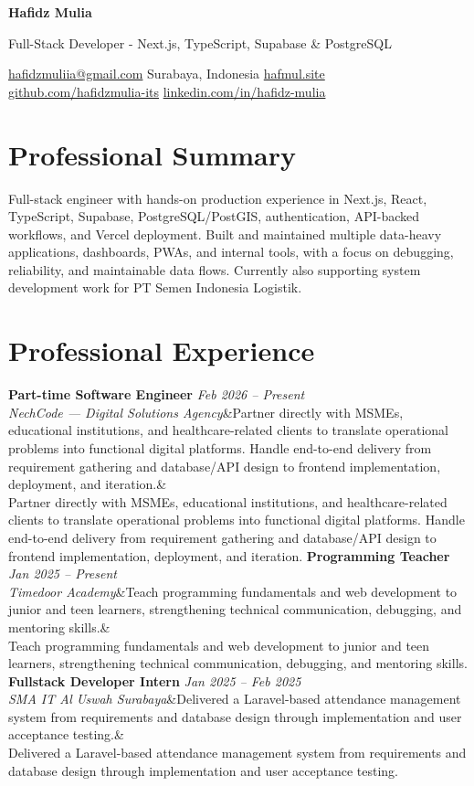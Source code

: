 \documentclass[a4paper,10.5pt]{article}
\newcommand{\cvname}[1]{{\centering\LARGE\bfseries #1\par\vspace{1pt}}}
\newcommand{\cvtitle}[1]{{\centering\normalsize\color{accent} #1\par\vspace{2pt}}}
\newcommand{\cvcontact}[1]{{\centering\small #1\par\vspace{4pt}}}
\newcommand{\cventry}[4]{\noindent\textbf{#1} \hfill \textit{#3} \\\textit{#2}\ifx&#4& \else \\ {\small #4} \fi\vspace{4pt}}
\begin{document}
\cvname{Hafidz Mulia}
\cvtitle{Full-Stack Developer - Next.js, TypeScript, Supabase \& PostgreSQL}
\cvcontact{\href{mailto:hafidzmuliia@gmail.com}{hafidzmuliia@gmail.com} \quad\textbar\quad Surabaya, Indonesia \quad\textbar\quad \href{https://hafmul.site}{hafmul.site} \\
\href{https://github.com/hafidzmulia-its}{github.com/hafidzmulia-its} \quad\textbar\quad \href{https://www.linkedin.com/in/hafidz-mulia/}{linkedin.com/in/hafidz-mulia}}

\section{Professional Summary}
Full-stack engineer with hands-on production experience in Next.js, React, TypeScript, Supabase, PostgreSQL/PostGIS, authentication, API-backed workflows, and Vercel deployment. Built and maintained multiple data-heavy applications, dashboards, PWAs, and internal tools, with a focus on debugging, reliability, and maintainable data flows. Currently also supporting system development work for PT Semen Indonesia Logistik.

\section{Professional Experience}
\cventry{Part-time Software Engineer}{NechCode --- Digital Solutions Agency}{Feb 2026 -- Present}{Partner directly with MSMEs, educational institutions, and healthcare-related clients to translate operational problems into functional digital platforms. Handle end-to-end delivery from requirement gathering and database/API design to frontend implementation, deployment, and iteration.}
\cventry{Programming Teacher}{Timedoor Academy}{Jan 2025 -- Present}{Teach programming fundamentals and web development to junior and teen learners, strengthening technical communication, debugging, and mentoring skills.}
\cventry{Fullstack Developer Intern}{SMA IT Al Uswah Surabaya}{Jan 2025 -- Feb 2025}{Delivered a Laravel-based attendance management system from requirements and database design through implementation and user acceptance testing.}
\end{document}
